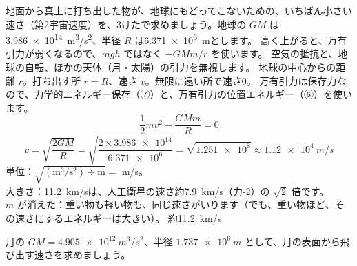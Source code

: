 \label{ph:力-4:ex11}
\begin{phreidai}[地球から飛び出す速さ]
地面から真上に打ち出した物が、地球にもどってこないための、いちばん小さい速さ（第2宇宙速度）を、3けたで求めましょう。地球の $GM$ は\qty{3.986e14}{m^3/s^2}、半径 $R$ は\qty{6.371e6}{m}とします。
\phbamen
高く上がると、万有引力が弱くなるので、$mgh$ ではなく $-GMm/r$ を使います。
\phmushi
空気の抵抗と、地球の自転、ほかの天体（月・太陽）の引力を無視します。
\phzu
地球の中心からの距離 $r$。打ち出す所 $r=R$、速さ $v$。無限に遠い所で速さ0。
\phriyu
万有引力は保存力なので、力学的エネルギー保存（⑦）と、万有引力の位置エネルギー（⑥）を使います。
\phtateru
\[\frac{1}{2}mv^2-\frac{GMm}{R}=0\]
\phtoku
\[v=\sqrt{\frac{2GM}{R}}=\sqrt{\frac{2\times\num{3.986e14}}{\num{6.371e6}}}=\sqrt{\num{1.251e8}}\approx\qty{1.12e4}{m/s}\]
\phtashikame
単位：$\sqrt{(\text{m}^3/\text{s}^2)\div\text{m}}=$ m/s。\\
大きさ：\qty{11.2}{km/s}は、人工衛星の速さ約\qty{7.9}{km/s}（力-2）の $\sqrt2$ 倍です。\\
$m$ が消えた：重い物も軽い物も、同じ速さがいります（でも、重い物ほど、その速さにするエネルギーは大きい）。
\kotae 約\qty{11.2}{km/s}
\end{phreidai}
\begin{jibun}
月の $GM=\qty{4.905e12}{m^3/s^2}$、半径 $\qty{1.737e6}{m}$ として、月の表面から飛び出す速さを求めましょう。
\end{jibun}

